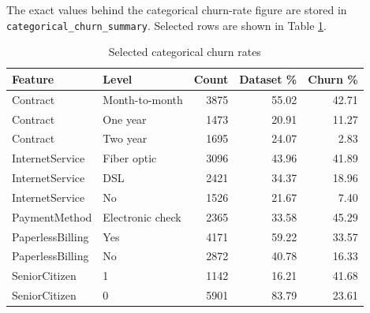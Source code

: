 The exact values behind the categorical churn-rate figure are stored in \texttt{categorical\_churn\_summary}. Selected rows are shown in Table \ref{tab:categorical-churn-selected}.

\begin{table}[H]
\centering
\caption{Selected categorical churn rates}
\label{tab:categorical-churn-selected}
\begin{tabular}{llrrr}
\toprule
Feature & Level & Count & Dataset \% & Churn \% \\
\midrule
Contract & Month-to-month & 3875 & 55.02 & 42.71 \\
Contract & One year & 1473 & 20.91 & 11.27 \\
Contract & Two year & 1695 & 24.07 & 2.83 \\
InternetService & Fiber optic & 3096 & 43.96 & 41.89 \\
InternetService & DSL & 2421 & 34.37 & 18.96 \\
InternetService & No & 1526 & 21.67 & 7.40 \\
PaymentMethod & Electronic check & 2365 & 33.58 & 45.29 \\
PaperlessBilling & Yes & 4171 & 59.22 & 33.57 \\
PaperlessBilling & No & 2872 & 40.78 & 16.33 \\
SeniorCitizen & 1 & 1142 & 16.21 & 41.68 \\
SeniorCitizen & 0 & 5901 & 83.79 & 23.61 \\
\bottomrule
\end{tabular}
\end{table}